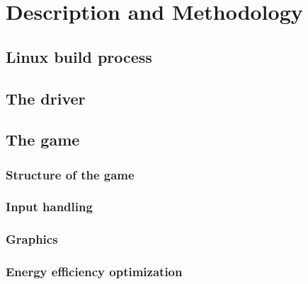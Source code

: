 \section{Description and Methodology}

\subsection{Linux build process}

\subsection{The driver}

\subsection{The game}

\subsubsection{Structure of the game}

\subsubsection{Input handling}

\subsubsection{Graphics}

\subsubsection{Energy efficiency optimization}
